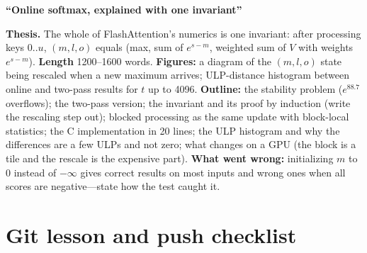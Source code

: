 \begin{blogbox}
 \textbf{``Online softmax, explained with one invariant''}

\textbf{Thesis.} The whole of FlashAttention's numerics is one invariant: after processing keys $0..u$, $(m, l, o)$ equals (max, sum of $e^{s-m}$, weighted sum of $V$ with weights $e^{s-m}$). \textbf{Length} 1200--1600 words. \textbf{Figures:} a diagram of the $(m,l,o)$ state being rescaled when a new maximum arrives; ULP-distance histogram between online and two-pass results for $t$ up to 4096. \textbf{Outline:} the stability problem ($e^{88.7}$ overflows); the two-pass version; the invariant and its proof by induction (write the rescaling step out); blocked processing as the same update with block-local statistics; the C implementation in 20 lines; the ULP histogram and why the differences are a few ULPs and not zero; what changes on a GPU (the block is a tile and the rescale is the expensive part). \textbf{What went wrong:} initializing $m$ to $0$ instead of $-\infty$ gives correct results on most inputs and wrong ones when all scores are negative---state how the test caught it.
\end{blogbox}

\section{Git lesson and push checklist}

